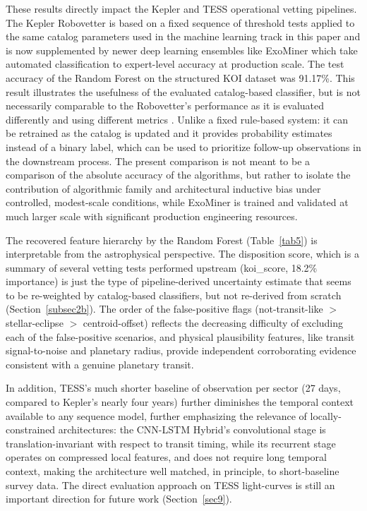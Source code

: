 \documentclass[preprint,11pt,times]{elsarticle}
\begin{document}
These results directly impact the Kepler and TESS operational vetting pipelines. The Kepler Robovetter is based on a fixed sequence of threshold tests applied to the same catalog parameters used in the machine learning track in this paper \cite{bib5} and is now supplemented by newer deep learning ensembles like ExoMiner \cite{bib14} which take automated classification to expert-level accuracy at production scale. The test accuracy of the Random Forest on the structured KOI dataset was 91.17\%. This result illustrates the usefulness of the evaluated catalog-based classifier, but is not necessarily comparable to the Robovetter's performance as it is evaluated differently and using different metrics \cite{bib8}. Unlike a fixed rule-based system: it can be retrained as the catalog is updated and it provides probability estimates instead of a binary label, which can be used to prioritize follow-up observations in the downstream process. The present comparison is not meant to be a comparison of the absolute accuracy of the algorithms, but rather to isolate the contribution of algorithmic family and architectural inductive bias under controlled, modest-scale conditions, while ExoMiner is trained and validated at much larger scale with significant production engineering resources.

The recovered feature hierarchy by the Random Forest (Table~\ref{tab5}) is interpretable from the astrophysical perspective. The disposition score, which is a summary of several vetting tests performed upstream (koi\_score, 18.2\% importance) is just the type of pipeline-derived uncertainty estimate that seems to be re-weighted by catalog-based classifiers, but not re-derived from scratch (Section~\ref{subsec2b}). The order of the false-positive flags (not-transit-like $>$ stellar-eclipse $>$ centroid-offset) reflects the decreasing difficulty of excluding each of the false-positive scenarios, and physical plausibility features, like transit signal-to-noise and planetary radius, provide independent corroborating evidence consistent with a genuine planetary transit.

In addition, TESS's much shorter baseline of observation per sector (27 days, compared to Kepler's nearly four years) further diminishes the temporal context available to any sequence model, further emphasizing the relevance of locally-constrained architectures: the CNN-LSTM Hybrid's convolutional stage is translation-invariant with respect to transit timing, while its recurrent stage operates on compressed local features, and does not require long temporal context, making the architecture well matched, in principle, to short-baseline survey data. The direct evaluation approach on TESS light-curves is still an important direction for future work (Section~\ref{sec9}).
\end{document}
